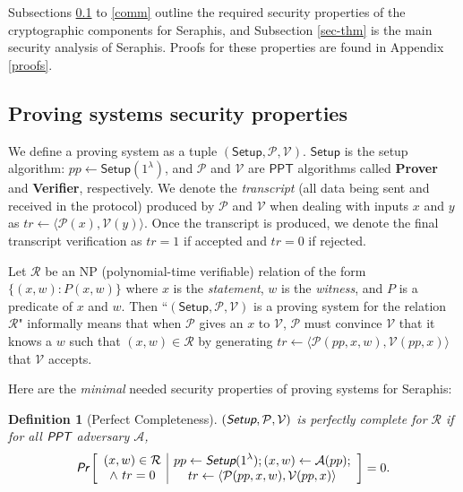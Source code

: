 \documentclass{article}
\theoremstyle{plain}
\newtheorem{definition}{Definition}[section]
\theoremstyle{remark}
\begin{document}
Subsections \ref{prov-prop} to \ref{comm} outline the required security properties of the cryptographic components for Seraphis, and Subsection \ref{sec-thm} is the main security analysis of Seraphis. Proofs for these properties are found in Appendix \ref{proofs}.

\subsection{Proving systems security properties}\label{prov-prop}
We define a proving system as a tuple $(\textsf{Setup}, \mathcal{P}, \mathcal{V})$. $\textsf{Setup}$ is the setup algorithm: $pp\leftarrow\textsf{Setup}(1^{\lambda})$, and $\mathcal{P}$ and $\mathcal{V}$ are $\textsf{PPT}$ algorithms called \textbf{Prover} and \textbf{Verifier}, respectively. We denote the \textit{transcript} (all data being sent and received in the protocol) produced by $\mathcal{P}$ and $\mathcal{V}$ when dealing with inputs $x$ and $y$ as $tr\leftarrow\langle\mathcal{P}(x), \mathcal{V}(y)\rangle$. Once the transcript is produced, we denote the final transcript verification as $tr=1$ if accepted and $tr=0$ if rejected. 

Let $\mathcal{R}$ be an NP (polynomial-time verifiable) relation of the form $\{(x,w):P(x, w)\}$ where $x$ is the \textit{statement}, $w$ is the \textit{witness}, and $P$ is a predicate of $x$ and $w$. Then ``$(\textsf{Setup}, \mathcal{P}, \mathcal{V})$ is a proving system for the relation $\mathcal{R}$" informally means that when $\mathcal{P}$ gives an $x$ to $\mathcal{V}$, $\mathcal{P}$ must convince $\mathcal{V}$ that it knows a $w$ such that $(x,w)\in\mathcal{R}$ by generating $tr\leftarrow\langle\mathcal{P}(pp, x, w), \mathcal{V}(pp, x)\rangle$ that $\mathcal{V}$ accepts.

Here are the \textit{minimal} needed security properties of proving systems for Seraphis:

\begin{definition}[Perfect Completeness]
$(\emph{\textsf{Setup}}, \mathcal{P}, \mathcal{V})$ is perfectly complete for $\mathcal{R}$ if for all $\emph{\textsf{PPT}}$ adversary $\mathcal{A}$,
\begin{align*}
\emph{\textsf{Pr}}\left[
\begin{array}{c|c}
    \begin{gathered}
        (x,w)\in\mathcal{R}\\
        \wedge\ tr=0
    \end{gathered}
    &
    \begin{gathered}
        pp\leftarrow\emph{\textsf{Setup}}(1^{\lambda}); (x, w)\leftarrow\mathcal{A}(pp); \\
        tr\leftarrow\langle\mathcal{P}(pp,x,w), \mathcal{V}(pp,x)\rangle
    \end{gathered}
\end{array}
\right]
= 0.
\end{align*}
\end{definition}
\end{document}
